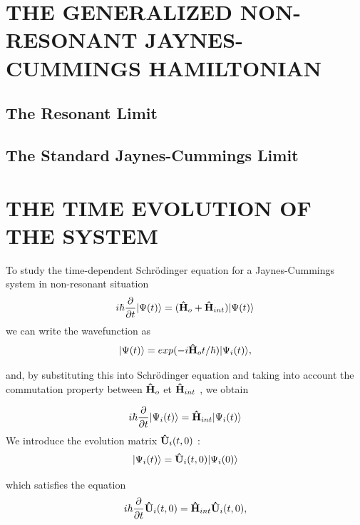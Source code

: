 \documentclass[a4paper, 10pt]{article}
\numberwithin{equation}{section}
\begin{document}
\begin{center}
    {\bf\section{THE GENERALIZED NON-RESONANT JAYNES-CUMMINGS HAMILTONIAN}}
\end{center}

\subsection*{The Resonant Limit}

\subsection*{The Standard Jaynes-Cummings Limit}
\vspace{0,5 cm}

\begin{center}
    {\bf\section{THE TIME EVOLUTION OF THE SYSTEM}}
\end{center}

\noindent
To study the time-dependent Schrödinger equation for a Jaynes-Cummings system in
non-resonant situation
\begin{equation}
    i\hbar\frac{\partial}{\partial t}|\Psi(t)\rangle = ({\bf \hat{H}}_o + {\bf \hat{H}}_{int}) |\Psi(t)\rangle
\end{equation}
\noindent
we can write the wavefunction as
\begin{equation}
    |\Psi(t)\rangle = exp(-i{\bf \hat{H}}_ot/\hbar) |\Psi_i(t)\rangle ,
\end{equation}

\noindent
and, by substituting this into Schrödinger equation and taking into account the commutation property between ${\bf\hat{H}}_o$ et ${\bf \hat{H}}_{int}$ , we obtain

\begin{equation}
    i\hbar\frac{\partial}{\partial t}|\Psi_i(t)\rangle = {\bf \hat{H}}_{int}|\Psi_i(t)\rangle
\end{equation}
\noindent
We introduce the evolution matrix ${\bf \hat{U}}_i(t,0)$ :
\begin{equation}
    |\Psi_i(t)\rangle = {\bf \hat{U}}_i(t,0)|\Psi_i(0)\rangle
\end{equation}

\noindent
which satisfies the equation
\begin{equation}
    i\hbar\frac{\partial}{\partial t} {\bf \hat{U}}_i(t,0) = {\bf \hat{H}}_{int} {\bf \hat{U}}_i(t,0) ,
\end{equation}
\end{document}
